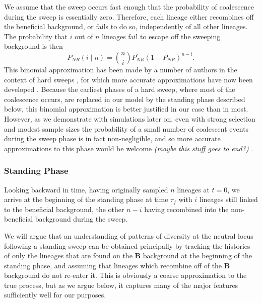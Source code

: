 \documentclass[a4paper,10pt]{article}
\newcommand{\fancyN}{$\mathcal N$ }
\newcommand{\fancyB}{$\mathcal B$ }
\newcommand{\jb}[1]{{\it\color{blue} (#1)} }
\begin{document}
We assume that the sweep occurs fast enough that the probability of coalescence during the sweep is essentially zero. Therefore, each lineage either recombines off the beneficial background, or fails to do so, independently of all other lineages. The probability that $i$ out of $n$ lineages fail to escape off the sweeping background is then
\begin{equation}
P_{NR}(i \mid n) = {n \choose i} P_{NR}^{i} (1-P_{NR})^{n-i}.
\end{equation}
This binomial approximation has been made by a number of authors in the context of hard sweeps \citep{Smith1974,Barton1998,Fay:2000us,McVean:2006ke}, for which more accurate approximations have now been developed \citep{Durrett:2004fl,Durrett:2005fr,Etheridge:2006fk,Messer:2012ie}. Because the earliest phases of a hard sweep, where most of the coalescence occurs, are replaced in our model by the standing phase described below, this binomial approximation is better justified in our case than in most. However, as we demonstrate with simulations later on, even with strong selection and modest sample sizes the probability of a small number of coalescent events during the sweep phase is in fact non-negligible, and so more accurate approximations to this phase would be welcome \jb{maybe this stuff goes to end?}.


\subsubsection{Standing Phase}
Looking backward in time, having originally sampled $n$ lineages at $t=0$, we arrive at the beginning of the standing phase at time $\tau_{f}$ with $i$ lineages still linked to the beneficial background, the other $n-i$ having recombined into the non-beneficial background during the sweep.

We will argue that an understanding of patterns of diversity at the neutral locus following a standing sweep can be obtained principally by tracking the histories of only the lineages that are found on the \textbf{B} background at the beginning of the standing phase, and assuming that lineages which recombine off of the \textbf{B} background do not re-enter it. This is obviously a coarse approximation to the true process, but as we argue below, it captures many of the major features sufficiently well for our purposes.

\end{document}
